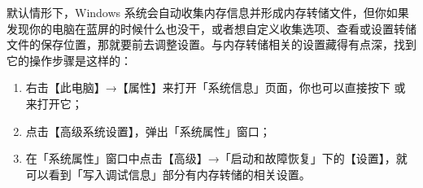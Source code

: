 默认情形下，Windows 系统会自动收集内存信息并形成内存转储文件，但你如果发现你的电脑在蓝屏的时候什么也没干，或者想自定义收集选项、查看或设置转储文件的保存位置，那就要前去调整设置。与内存转储相关的设置藏得有点深，找到它的操作步骤是这样的：

\begin{enumerate}
  \item 右击【此电脑】→【属性】来打开「系统信息」页面，你也可以直接按下  或  来打开它；
  \item 点击【高级系统设置】，弹出「系统属性」窗口；
  \item 在「系统属性」窗口中点击【高级】→「启动和故障恢复」下的【设置】，就可以看到「写入调试信息」部分有内存转储的相关设置。
\end{enumerate}

